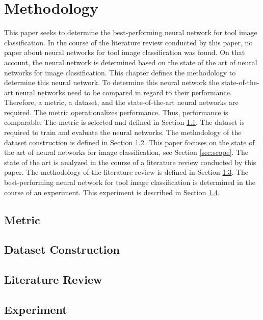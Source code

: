 \chapter{Methodology}
\label{chp:metho}
This paper seeks to determine the best-performing neural network for tool image classification. In the course of the literature review conducted by this paper, no paper about neural networks for tool image classification was found. On that account, the neural network is determined based on the state of the art of neural networks for image classification.
This chapter defines the methodology to determine this neural network. To determine this neural network the state-of-the-art neural networks need to be compared in regard to their performance.
Therefore, a metric, a dataset, and the state-of-the-art neural networks are required.
The metric operationalizes performance. Thus, performance is comparable. The metric is selected and defined in Section \ref{sec:metric}.
The dataset is required to train and evaluate the neural networks. \autocite{LeCun.2015} The methodology of the dataset construction is defined in Section \ref{sec:datasetconstruction}.
This paper focuses on the state of the art of neural networks for image classification, see Section \ref{sec:scope}. The state of the art is analyzed in the course of a literature review conducted by this paper. The methodology of the literature review is defined in Section \ref{sec:litrev}.
The best-performing neural network for tool image classification is determined in the course of an experiment. This experiment is described in Section \ref{sec:experiment}.

\section{Metric}
\label{sec:metric}


\section{Dataset Construction}
\label{sec:datasetconstruction}


\section{Literature Review}
\label{sec:litrev}


\section{Experiment}
\label{sec:experiment}
